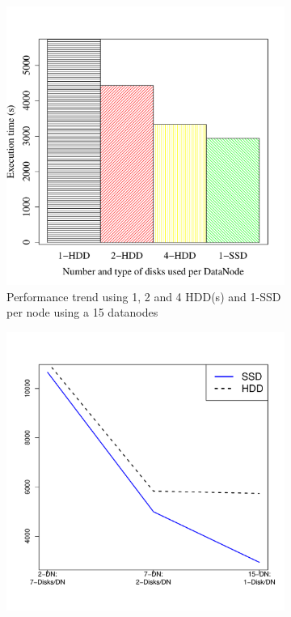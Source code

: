 \documentclass[conference]{IEEEtran}
\begin{document}
\begin{figure}[h]
  \centering
  \begin{subfigure}[b]{0.23\textwidth}
          \includegraphics[width=\textwidth]{Figure/PerormanceData/Plots/SSDHDDSameNode.pdf}
          \caption{Performance trend using 1, 2 and 4 HDD(s) and 1-SSD per node using a 15 datanodes}
          \label{fig:SsdN4Hdd}
  \end{subfigure}
  \begin{subfigure}[b]{0.23\textwidth}
          \includegraphics[width=\textwidth]{Figure/PerormanceData/Plots/SSDHDDDiffNode.pdf}

\end{subfigure}
\end{figure}
\end{document}
